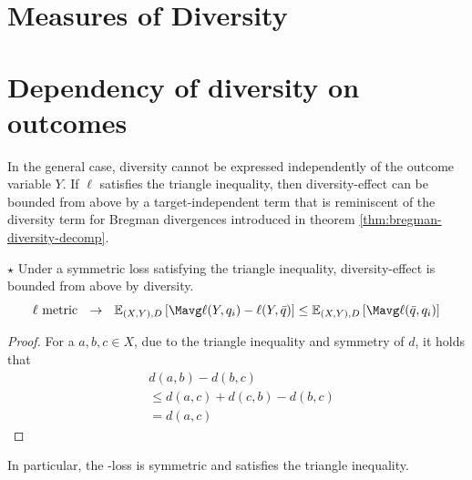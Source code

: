 \documentclass[
	twoside=false, %
]{kaobook}
\begin{document}
\section{Measures of Diversity}
\label{sec:diversity-measures}








\section{Dependency of diversity on outcomes}



In the general case, diversity cannot be expressed independently of the outcome variable $Y$. If $\ell$ satisfies the triangle inequality, then diversity-effect can be bounded from above by a target-independent term that is reminiscent of the diversity term for Bregman divergences introduced in theorem \ref{thm:bregman-diversity-decomp}.
\begin{lemma} $\star$ Under a symmetric loss satisfying the triangle inequality, diversity-effect is bounded from above by diversity. 
$$
\text{$\ell$ metric}  ~~\rightarrow~~ \mathbb{E}_{(X,Y), D}\left[ \Mavg \ell(Y, q_{i}) - \ell(Y, \bar{q}) \right] 
\leq \mathbb{E}_{(X,Y),D}\left[ \Mavg \ell(\bar{q}, q_{i}) \right] 
$$
\end{lemma}
\begin{proof}
For a $a,b,c \in X$, due to the triangle inequality and symmetry of $d$, it holds that
\begin{align*}
& d(a,b) - d(b,c)  \\
& \leq d(a,c) + d(c,b) - d(b,c) \\
&= d(a,c)
\end{align*}
\end{proof}
In particular, the \zeroone-loss is symmetric and satisfies the triangle inequality.



\end{document}

